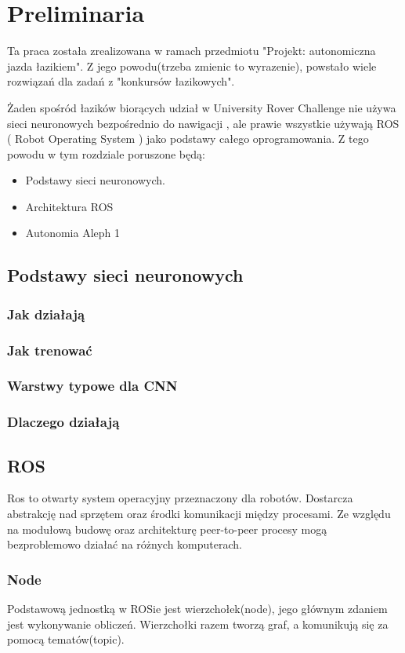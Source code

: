 \chapter{Preliminaria}
Ta praca została zrealizowana w ramach przedmiotu "Projekt: autonomiczna jazda łazikiem".
Z jego powodu(trzeba zmienic to wyrazenie), powstało wiele rozwiązań dla zadań z 
"konkursów łazikowych".

Żaden spośród łazików biorących udział w University Rover Challenge nie 
używa sieci neuronowych bezpośrednio do nawigacji , ale prawie wszystkie używają
ROS ( Robot Operating System ) jako podstawy całego oprogramowania. Z tego powodu
w tym rozdziale poruszone będą:
\begin{itemize}
  \item Podstawy sieci neuronowych.
  \item Architektura ROS
  \item Autonomia Aleph 1
\end{itemize}

\section{Podstawy sieci neuronowych}
\subsection{Jak działają}
\subsection{Jak trenować}
\subsection{Warstwy typowe dla CNN}
\subsection{Dlaczego działają}


\section{ROS}
Ros to otwarty system operacyjny przeznaczony dla robotów.
Dostarcza abstrakcję nad sprzętem oraz środki komunikacji między procesami.
Ze względu na modułową budowę oraz architekturę peer-to-peer procesy mogą
bezproblemowo działać na różnych komputerach.
\subsection{Node}
Podstawową jednostką w ROSie jest wierzchołek(node), jego głównym zdaniem jest
wykonywanie obliczeń. Wierzchołki razem tworzą graf, a komunikują się za 
pomocą tematów(topic).

